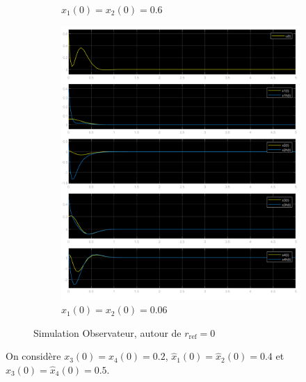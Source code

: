 \documentclass[class=article, crop=false]{standalone}
\begin{document}
\begin{resolution}
\begin{figure}[H]
\begin{subfigure}[b]{0.45\textwidth}
            \caption{$x_1(0) = x_2(0) = 0.6$}
        \end{subfigure}
        \begin{subfigure}[b]{0.45\textwidth}
            \centering
            \includegraphics[width=\textwidth]{../images/m4_r0_s0.06_o0.4.png}
            \caption{$x_1(0) = x_2(0) = 0.06$}
        \end{subfigure}
        \caption{Simulation Observateur, autour de $r_{\text{ref}} = 0$}
    \end{figure}
    On considère $x_3(0) = x_4(0) = 0.2$, $\hat{x}_1(0) = \hat{x}_2(0) = 0.4$ et $\hat{x}_3(0) = \hat{x}_4(0) = 0.5$.
\end{resolution}
\end{document}
